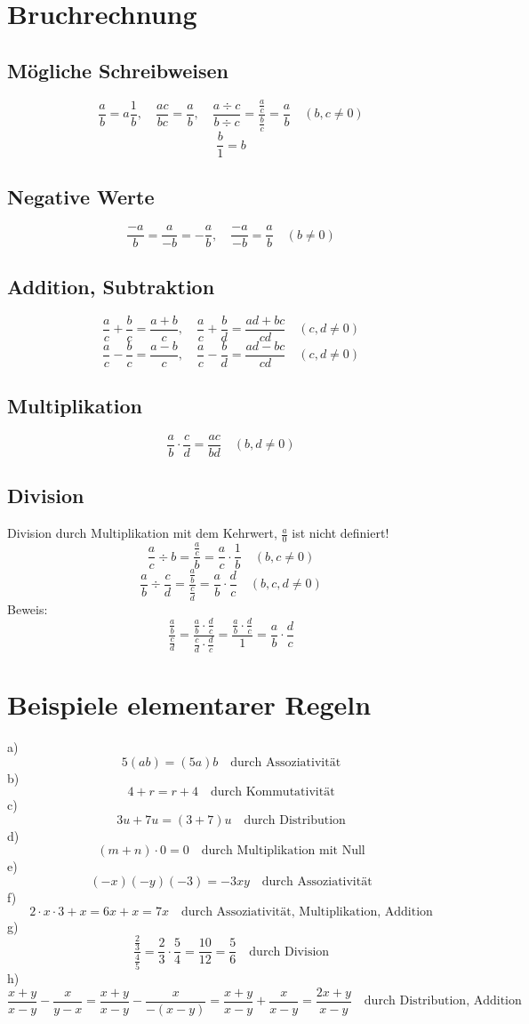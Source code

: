 \documentclass[a4paper]{article}
\begin{document}
\section{Bruchrechnung}
\subsection{Mögliche Schreibweisen}
\[\frac{a}{b} = a\frac{1}{b}, \quad \frac{ac}{bc} = \frac{a}{b}, \quad \frac{a \div c}{b \div c} =\frac{\frac{a}{c}}{\frac{b}{c}} = \frac{a}{b} \quad (b,c \neq 0) \]
\[\frac{b}{1} = b\]
\subsection{Negative Werte}
\[\frac{-a}{b} = \frac{a}{-b} = -\frac{a}{b}, \quad \frac{-a}{-b} = \frac{a}{b} \quad (b \neq 0) \]
\subsection{Addition, Subtraktion}
\[\frac{a}{c} + \frac{b}{c} = \frac{a+b}{c}, \quad \frac{a}{c} + \frac{b}{d} = \frac{ad+bc}{cd} \quad (c,d \neq 0)  \] 
\[\frac{a}{c} - \frac{b}{c} = \frac{a-b}{c}, \quad \frac{a}{c} - \frac{b}{d} = \frac{ad-bc}{cd} \quad (c,d \neq 0) \]
\subsection{Multiplikation}
\[\frac{a}{b} \cdot \frac{c}{d} = \frac{ac}{bd} \quad (b,d \neq 0) \]
\subsection{Division}
Division durch Multiplikation mit dem Kehrwert, $\frac{a}{0}$ ist nicht definiert!
\[\frac{a}{c} \div b = \frac{\frac{a}{c}}{b} = \frac{a}{c} \cdot \frac{1}{b} \quad (b,c \neq 0) \] 
\[\frac{a}{b} \div \frac{c}{d} = \frac{\frac{a}{b}}{\frac{c}{d}} = \frac{a}{b} \cdot \frac{d}{c} \quad (b,c,d \neq 0) \]
Beweis: \[\frac{\frac{a}{b}}{\frac{c}{d}} = \frac{\frac{a}{b} \cdot \frac{d}{c}}{\frac{c}{d} \cdot \frac{d}{c}} = \frac{\frac{a}{b} \cdot \frac{d}{c}}{1} = \frac{a}{b} \cdot \frac{d}{c} \]

\section{Beispiele elementarer Regeln}
a) \[ 5(ab) = (5a)b \quad \text{durch Assoziativität} \]
b) \[ 4+r = r+4 \quad \text{durch Kommutativität} \]
c) \[ 3u + 7u = (3+7)u \quad \text{durch Distribution} \]
d) \[ (m+n) \cdot 0 = 0 \quad \text{durch Multiplikation mit Null} \]
e) \[ (-x)(-y)(-3) = -3xy \quad \text{durch Assoziativität} \]
f) \[ 2 \cdot x \cdot 3 + x = 6x + x = 7x \quad \text{durch Assoziativität, Multiplikation, Addition} \]
g) \[ \frac{\frac{2}{3}}{\frac{4}{5}} = \frac{2}{3} \cdot \frac{5}{4} = \frac{10}{12} = \frac{5}{6} \quad \text{durch Division} \]
h) \[ \frac{x+y}{x-y}-\frac{x}{y-x} = \frac{x+y}{x-y}-\frac{x}{-(x-y)} = \frac{x+y}{x-y}+\frac{x}{x-y} = \frac{2x+y}{x-y} \quad \text{durch Distribution, Addition} \]
\end{document}
